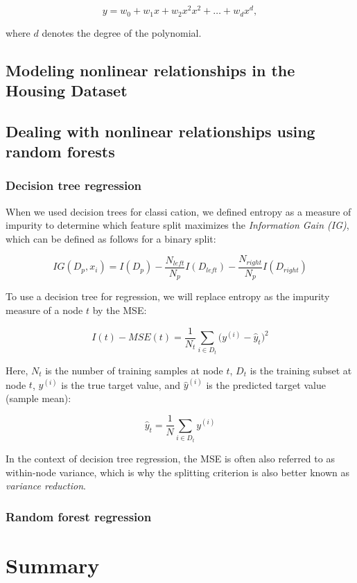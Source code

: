 \documentclass[letterpaper]{report}
\begin{document}
\[
y = w_0 + w_1 x + w_2 x^2 x^2 + \dots + w_d x^d,
\]

where $d$ denotes the degree of the polynomial.

\subsection{Modeling nonlinear relationships in the Housing Dataset}
\subsection{Dealing with nonlinear relationships using random forests}
\subsubsection{Decision tree regression}

When we used decision trees for classi cation, we defined entropy as a measure of impurity to determine which feature split maximizes the \textit{Information Gain (IG)}, which can be defined as follows for a binary split:

\[
IG(D_p, x_i) = I(D_p) - \frac{N_{left}}{N_{p}} I (D_{left}) - \frac{N_{right}}{N_p} I (D_{right})
\]

To use a decision tree for regression, we will replace entropy as the impurity measure of a node $t$ by the MSE:

\[
I(t) - MSE(t) = \frac{1}{N_t} \sum_{i \in D_t} \big( y^{(i)} - \hat{y}_t  \big)^2
\]

Here, $N_t$ is the number of training samples at node $t$, $D_t$ is the training subset at node $t$, $y^{(i)}$ is the true target value, and $\hat{y}^{(i)}$ is the predicted target value (sample mean):

\[
\hat{y}_t = \frac{1}{N} \sum_{i \in D_t} y^{(i)}
\]

In the context of decision tree regression, the MSE is often also referred to as within-node variance, which is why the splitting criterion is also better known
as \textit{variance reduction}. 

\subsubsection{Random forest regression}
\section{Summary}
\end{document}
